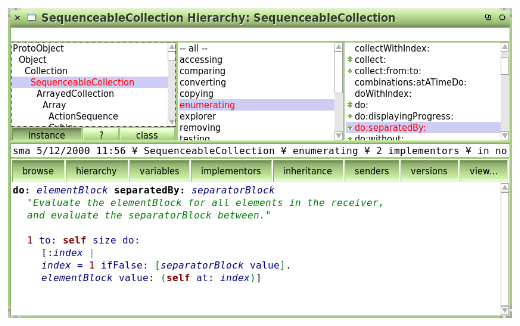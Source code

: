 \documentclass[notumble]{leaflet}
\begin{document}
\subsection{\stMessageSendingTerm}

\stMessageSendingDefinition

\paragraph{\stUnaryMessagesTerm}

\stUnaryMessagesDefinition

\paragraph{\stBinaryMessagesTerm}

\stBinaryMessagesDefinition

\paragraph{\stKeywordMessagesTerm}

\stKeywordMessagesDefinition

\pagebreak{}

\section{\stDevelopmentEnvironmentTerm}

\stDevelopmentEnvironmentDefinition

\begin{center}
  \includegraphics[width=.9\textwidth]{squeak}\\
  \stSqueakCodeBrowserTerm
\end{center}

\section{\stImplementationTerm}
\end{document}
